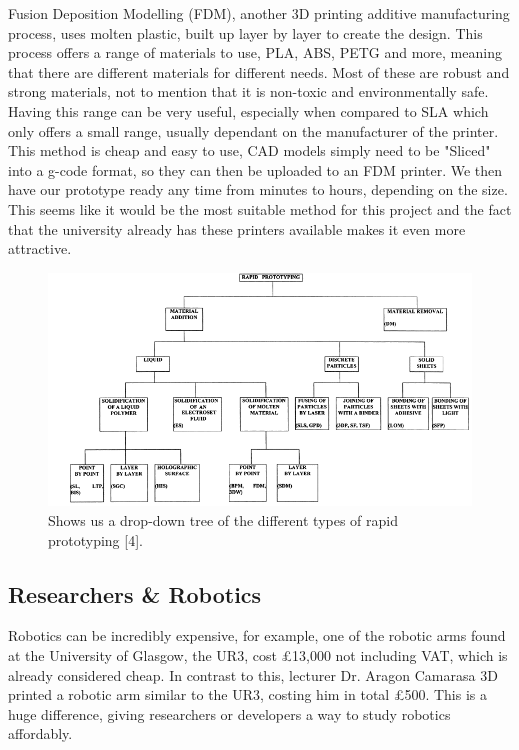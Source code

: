 \documentclass{l4proj}
\begin{document}
Fusion Deposition Modelling (FDM), another 3D printing additive manufacturing process, uses molten plastic, built up layer by layer to create the design. This process offers a range of materials to use, PLA, ABS, PETG and more, meaning that there are different materials for different needs. Most of these are robust and strong materials, not to mention that it is non-toxic and environmentally safe. Having this range can be very useful, especially when compared to SLA which only offers a small range, usually dependant on the manufacturer of the printer. This method is cheap and easy to use, CAD models simply need to be "Sliced" into a g-code format, so they can then be uploaded to an FDM printer. We then have our prototype ready any time from minutes to hours, depending on the size. This seems like it would be the most suitable method for this project and the fact that the university already has these printers available makes it even more attractive. 

\begin{figure}[!ht]
  \centering
  \includegraphics[width=0.9\linewidth]{images/rapidPrototyping.png}   

  \caption{Shows us a drop-down tree of the different types of rapid prototyping [4].}
\end{figure}


\subsection{Researchers \& Robotics}
Robotics can be incredibly expensive, for example, one of the robotic arms found at the University of Glasgow, the UR3, cost £13,000 not including VAT, which is already considered cheap. In contrast to this, lecturer Dr. Aragon Camarasa 3D printed a robotic arm similar to the UR3, costing him in total £500. This is a huge difference, giving researchers or developers a way to study robotics affordably. 
\end{document}
